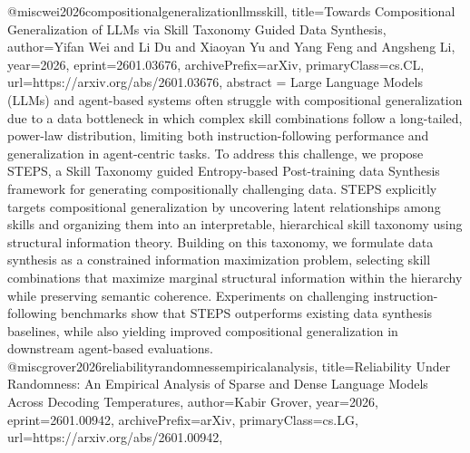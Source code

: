 {}@misc{wei2026compositionalgeneralizationllmsskill,
      title={Towards Compositional Generalization of LLMs via Skill Taxonomy Guided Data Synthesis}, 
      author={Yifan Wei and Li Du and Xiaoyan Yu and Yang Feng and Angsheng Li},
      year={2026},
      eprint={2601.03676},
      archivePrefix={arXiv},
      primaryClass={cs.CL},
      url={https://arxiv.org/abs/2601.03676},
      abstract = {Large Language Models (LLMs) and agent-based systems often struggle with compositional generalization due to a data bottleneck in which complex skill combinations follow a long-tailed, power-law distribution, limiting both instruction-following performance and generalization in agent-centric tasks. To address this challenge, we propose STEPS, a Skill Taxonomy guided Entropy-based Post-training data Synthesis framework for generating compositionally challenging data. STEPS explicitly targets compositional generalization by uncovering latent relationships among skills and organizing them into an interpretable, hierarchical skill taxonomy using structural information theory. Building on this taxonomy, we formulate data synthesis as a constrained information maximization problem, selecting skill combinations that maximize marginal structural information within the hierarchy while preserving semantic coherence. Experiments on challenging instruction-following benchmarks show that STEPS outperforms existing data synthesis baselines, while also yielding improved compositional generalization in downstream agent-based evaluations.}
}@misc{grover2026reliabilityrandomnessempiricalanalysis,
      title={Reliability Under Randomness: An Empirical Analysis of Sparse and Dense Language Models Across Decoding Temperatures}, 
      author={Kabir Grover},
      year={2026},
      eprint={2601.00942},
      archivePrefix={arXiv},
      primaryClass={cs.LG},
      url={https://arxiv.org/abs/2601.00942},
}
